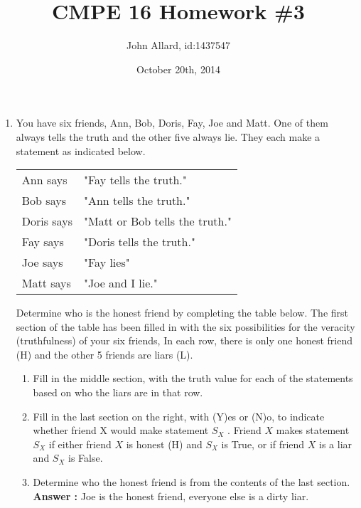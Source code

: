 \documentclass[a4paper,11pt]{article}
\title{ CMPE 16 Homework \#3}
\author{John Allard, id:1437547}
\date{October 20th, 2014}
\newcommand{\answer}{\textbf{Answer : }}
\begin{document}
\maketitle


\begin{enumerate}


\item You have six friends, Ann, Bob, Doris, Fay, Joe and Matt. One of them always tells the
truth and the other five always lie. They each make a statement as indicated below. \\[.2in]
\begin{tabular}{l l}
Ann says  & "Fay tells the truth." \\ 
Bob says  & "Ann tells the truth." \\
Doris says  & "Matt or Bob tells the truth." \\
Fay says  & "Doris tells the truth." \\
Joe says  & "Fay lies" \\
Matt says  & "Joe and I lie." \\[.2in]
\end{tabular}

Determine who is the honest friend by completing the table below. The first section of the table has been filled in with the six possibilities for the veracity (truthfulness) of your six friends, In each row, there is only one honest friend (H) and the other 5 friends are liars (L).

  \begin{enumerate}
  \item Fill in the middle section, with the truth value for each of the statements based on who the liars
  are in that row. 
  \item Fill in the last section on the right, with (Y)es or (N)o, to indicate whether friend X would make statement $S_X$ . Friend $X$ makes statement $S_X$ if either friend $X$ is honest (H) and $S_X$ is True, or if friend $X$ is a liar and $S_X$ is False.
  \item Determine who the honest friend is from the contents of the last section. \\ \answer Joe is the honest friend, everyone else is a dirty liar. \\[.2in]
  \end{enumerate}


\end{enumerate}
\end{document}
